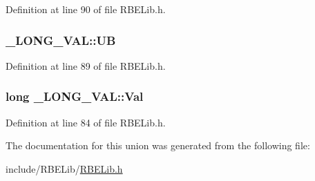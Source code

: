 Definition at line 90 of file R\+B\+E\+Lib.\+h.

\hypertarget{union___l_o_n_g___v_a_l_a6eef702c6cc53b486d69105cb613fb1a}{
\subsubsection[{U\+B}]{ \+\_\+\+L\+O\+N\+G\+\_\+\+V\+A\+L\+::\+U\+B}}\label{union___l_o_n_g___v_a_l_a6eef702c6cc53b486d69105cb613fb1a}


Definition at line 89 of file R\+B\+E\+Lib.\+h.

\hypertarget{union___l_o_n_g___v_a_l_a1e66ee294dc88fdfe6e8e11f21150542}{
\subsubsection[{Val}]{\setlength{\rightskip}{0pt plus 5cm}long \+\_\+\+L\+O\+N\+G\+\_\+\+V\+A\+L\+::\+Val}}\label{union___l_o_n_g___v_a_l_a1e66ee294dc88fdfe6e8e11f21150542}


Definition at line 84 of file R\+B\+E\+Lib.\+h.



The documentation for this union was generated from the following file\+:\begin{DoxyCompactItemize}
\item 
include/\+R\+B\+E\+Lib/\hyperlink{_r_b_e_lib_8h}{R\+B\+E\+Lib.\+h}\end{DoxyCompactItemize}
